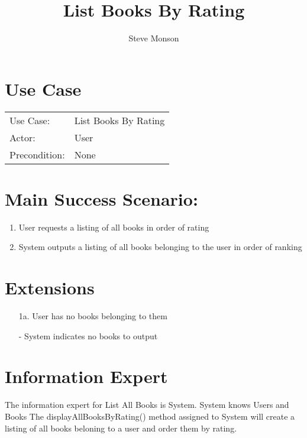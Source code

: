 \documentclass{article}
\title{List Books By Rating}
\author{Steve Monson}
\begin{document}
\maketitle

\section*{Use Case}

\begin{tabular}{l l}
Use Case:     & List Books By Rating \\
Actor:        & User \\
Precondition: & None \\
\end{tabular}

\section*{Main Success Scenario:}

\begin{enumerate}
    \item User requests a listing of all books in order of rating
    \item System outputs a listing of all books belonging to the user in order of ranking
\end{enumerate}

\section*{Extensions}


\begin{itemize}
    \item [1a.] User has no books belonging to them
       
    - System indicates no books to output
\end{itemize}

\section*{Information Expert}

The information expert for List All Books is System.
System knows Users and Books
The displayAllBooksByRating() method assigned to System will create a listing of all books beloning to a user and order them by rating.
\end{document}
